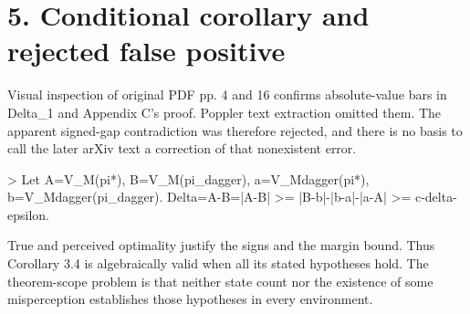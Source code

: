 \documentclass[10pt]{article}
\begin{document}
\section*{5. Conditional corollary and rejected false positive}
Visual inspection of original PDF pp. 4 and 16 confirms absolute-value bars in Delta\_1 and Appendix C’s proof. Poppler text extraction omitted them. The apparent signed-gap contradiction was therefore rejected, and there is no basis to call the later arXiv text a correction of that nonexistent error.\par
> Let A=V\_M(pi*), B=V\_M(pi\_dagger), a=V\_Mdagger(pi*), b=V\_Mdagger(pi\_dagger). Delta=A-B=|A-B| >= |B-b|-|b-a|-|a-A| >= c-delta-epsilon.\par
True and perceived optimality justify the signs and the margin bound. Thus Corollary 3.4 is algebraically valid when all its stated hypotheses hold. The theorem-scope problem is that neither state count nor the existence of some misperception establishes those hypotheses in every environment.\par
\end{document}
